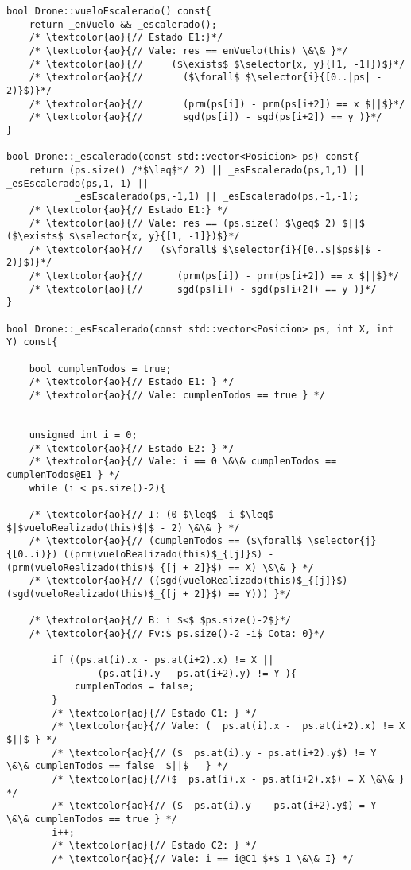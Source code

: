 \begin{lstlisting}
bool Drone::vueloEscalerado() const{
    return _enVuelo && _escalerado();
    /* \textcolor{ao}{// Estado E1:}*/
    /* \textcolor{ao}{// Vale: res == enVuelo(this) \&\& }*/
    /* \textcolor{ao}{//     ($\exists$ $\selector{x, y}{[1, -1]})$}*/
    /* \textcolor{ao}{//       ($\forall$ $\selector{i}{[0..|ps| - 2)}$)}*/
    /* \textcolor{ao}{//       (prm(ps[i]) - prm(ps[i+2]) == x $||$}*/
    /* \textcolor{ao}{//       sgd(ps[i]) - sgd(ps[i+2]) == y )}*/
}

bool Drone::_escalerado(const std::vector<Posicion> ps) const{
    return (ps.size() /*$\leq$*/ 2) || _esEscalerado(ps,1,1) || _esEscalerado(ps,1,-1) ||
            _esEscalerado(ps,-1,1) || _esEscalerado(ps,-1,-1);
    /* \textcolor{ao}{// Estado E1:} */
    /* \textcolor{ao}{// Vale: res == (ps.size() $\geq$ 2) $||$ ($\exists$ $\selector{x, y}{[1, -1]})$}*/
    /* \textcolor{ao}{//   ($\forall$ $\selector{i}{[0..$|$ps$|$ - 2)}$)}*/
    /* \textcolor{ao}{//      (prm(ps[i]) - prm(ps[i+2]) == x $||$}*/
    /* \textcolor{ao}{//      sgd(ps[i]) - sgd(ps[i+2]) == y )}*/
}

bool Drone::_esEscalerado(const std::vector<Posicion> ps, int X, int Y) const{

    bool cumplenTodos = true;
    /* \textcolor{ao}{// Estado E1: } */
    /* \textcolor{ao}{// Vale: cumplenTodos == true } */


    unsigned int i = 0;
    /* \textcolor{ao}{// Estado E2: } */
    /* \textcolor{ao}{// Vale: i == 0 \&\& cumplenTodos == cumplenTodos@E1 } */
    while (i < ps.size()-2){
    
    /* \textcolor{ao}{// I: (0 $\leq$  i $\leq$ $|$vueloRealizado(this)$|$ - 2) \&\& } */
    /* \textcolor{ao}{// (cumplenTodos == ($\forall$ \selector{j}{[0..i)}) ((prm(vueloRealizado(this)$_{[j]}$) - (prm(vueloRealizado(this)$_{[j + 2]}$) == X) \&\& } */ 
    /* \textcolor{ao}{// ((sgd(vueloRealizado(this)$_{[j]}$) - (sgd(vueloRealizado(this)$_{[j + 2]}$) == Y))) }*/
     
    /* \textcolor{ao}{// B: i $<$ $ps.size()-2$}*/
    /* \textcolor{ao}{// Fv:$ ps.size()-2 -i$ Cota: 0}*/

        if ((ps.at(i).x - ps.at(i+2).x) != X ||
                (ps.at(i).y - ps.at(i+2).y) != Y ){
            cumplenTodos = false;
        }
        /* \textcolor{ao}{// Estado C1: } */
        /* \textcolor{ao}{// Vale: (  ps.at(i).x -  ps.at(i+2).x) != X $||$ } */ 
        /* \textcolor{ao}{// ($  ps.at(i).y - ps.at(i+2).y$) != Y  \&\& cumplenTodos == false  $||$   } */ 
        /* \textcolor{ao}{//($  ps.at(i).x - ps.at(i+2).x$) = X \&\& } */ 
        /* \textcolor{ao}{// ($  ps.at(i).y -  ps.at(i+2).y$) = Y  \&\& cumplenTodos == true } */
        i++;
        /* \textcolor{ao}{// Estado C2: } */
        /* \textcolor{ao}{// Vale: i == i@C1 $+$ 1 \&\& I} */


\end{lstlisting}
